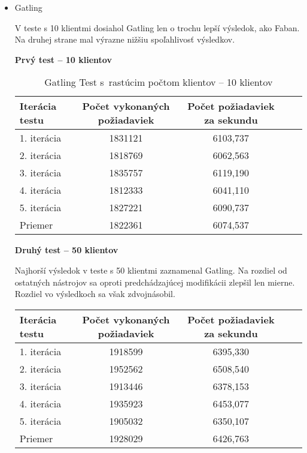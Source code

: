 \documentclass[12pt,oneside,final]{fithesis-utf8}
\begin{document}
\begin{itemize}
\item Gatling

V teste s 10 klientmi dosiahol Gatling len o trochu lepší výsledok, ako Faban. Na druhej strane mal výrazne nižšiu spoľahlivosť výsledkov.

\textbf{Prvý test -- 10 klientov}

\begin{table}[H]
\begin{center}
\begin{tabular}{ | l | c | c | c | c |}
		\hline
		 \textbf{Iterácia testu} & \textbf{Počet vykonaných požiadaviek} & \textbf{Počet požiadaviek za sekundu} \\ \hline
		 1. iterácia & 1831121 & 6103,737 \\ \hline
		 2. iterácia & 1818769 & 6062,563 \\ \hline
		 3. iterácia & 1835757 & 6119,190 \\ \hline
		 4. iterácia & 1812333 & 6041,110 \\ \hline
		 5. iterácia & 1827221 & 6090,737 \\ \hline
		 Priemer & 1822361 & 6074,537 \\ \hline
		 
\end{tabular}
\end{center}
\caption{Gatling Test s~rastúcim počtom klientov -- 10 klientov}
\end{table}


\textbf{Druhý test -- 50 klientov}

Najhorší výsledok v teste s 50 klientmi zaznamenal Gatling. Na rozdiel od ostatných nástrojov sa oproti predchádzajúcej modifikácii zlepšil len mierne. Rozdiel vo výsledkoch sa však zdvojnásobil.

\begin{table}[H]
\begin{center}
\begin{tabular}{ | l | c | c | c | c |}
		\hline
		 \textbf{Iterácia testu} & \textbf{Počet vykonaných požiadaviek} & \textbf{Počet požiadaviek za sekundu} \\ \hline
		 1. iterácia & 1918599 & 6395,330 \\ \hline
		 2. iterácia & 1952562 & 6508,540 \\ \hline
		 3. iterácia & 1913446 & 6378,153 \\ \hline
		 4. iterácia & 1935923 & 6453,077 \\ \hline
		 5. iterácia & 1905032 & 6350,107 \\ \hline
		 Priemer & 1928029 & 6426,763 \\ \hline
		 

\end{tabular}
\end{center}
\end{table}
\end{itemize}
\end{document}
